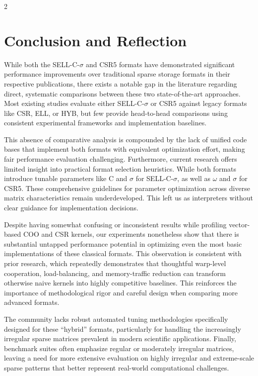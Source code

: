 \documentclass{article}
\begin{document}
\begin{multicols}{2}
\section{Conclusion and Reflection}

While both the SELL-C-$\sigma$ and CSR5 formats have demonstrated significant performance improvements over traditional sparse storage formats in their respective publications, there exists a notable gap in the literature regarding direct, systematic comparisons between these two state-of-the-art approaches. Most existing studies evaluate either SELL-C-$\sigma$ or CSR5 against legacy formats like CSR, ELL, or HYB, but few provide head-to-head comparisons using consistent experimental frameworks and implementation baselines. 

This absence of comparative analysis is compounded by the lack of unified code bases that implement both formats with equivalent optimization effort, making fair performance evaluation challenging. Furthermore, current research offers limited insight into practical format selection heuristics. While both formats introduce tunable parameters like C and $\sigma$ for SELL-C-$\sigma$, as well as $\omega$ and $\sigma$ for CSR5. These comprehensive guidelines for parameter optimization across diverse matrix characteristics remain underdeveloped. This left us as interpreters without clear guidance for implementation decisions. 

Despite having somewhat confusing or inconsistent results while profiling vector-based COO and CSR kernels, our experiments nonetheless show that there is substantial untapped performance potential in optimizing even the most basic implementations of these classical formats. This observation is consistent with prior research, which repeatedly demonstrates that thoughtful warp-level cooperation, load-balancing, and memory-traffic reduction can transform otherwise naive kernels into highly competitive baselines. This reinforces the importance of methodological rigor and careful design when comparing more advanced formats.

The community lacks robust automated tuning methodologies specifically designed for these “hybrid” formats, particularly for handling the increasingly irregular sparse matrices prevalent in modern scientific applications. Finally, benchmark suites often emphasize regular or moderately irregular matrices, leaving a need for more extensive evaluation on highly irregular and extreme-scale sparse patterns that better represent real-world computational challenges.


\end{multicols}
\end{document}
